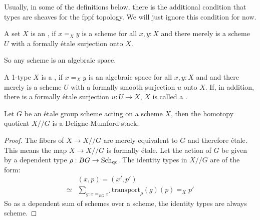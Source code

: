 Usually, in some of the definitions below,
there is the additional condition that types are sheaves for the fppf topology.
We will just ignore this condition for now.

\begin{definition}
  A set $X$ is an ,
  if $x=_Xy$ is a scheme for all $x,y:X$ and
  there merely is a scheme $U$ with a formally étale surjection onto $X$.
\end{definition}

So any scheme is an algebraic space.

\begin{definition}
  A 1-type $X$ is a ,
  if $x=_Xy$ is an algebraic space for all $x,y:X$ and
  and there merely is a scheme $U$ with a formally smooth surjection $u$ onto $X$.
  If, in addition, there is a
  formally étale surjection $u:U\to X$,
  $X$ is called a .
\end{definition}

\begin{proposition}
  Let $G$ be an étale group scheme acting on a scheme $X$,
  then the homotopy quotient $X//G$ is a Deligne-Mumford stack.
\end{proposition}

\begin{proof}
  The fibers of $X\to X//G$ are merely equivalent to $G$
  and therefore étale.
  This means the map $X\to X//G$ is formally étale.
  Let the action of $G$ be given by a dependent type
  $\rho:BG\to \operatorname{\mathrm{Sch}_{qc}}$.
  The identity types in $X//G$ are of the form:
  \begin{align*}
    &(x,p)=(x',p') \\
    \simeq& \sum_{g:x=_{BG}x'}\mathrm{transport}_{\rho}(g)(p)=_Xp'
  \end{align*}
  So as a dependent sum of schemes over a scheme,
  the identity types are always scheme. 
\end{proof}